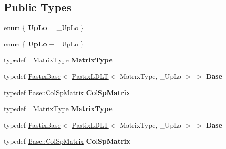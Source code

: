 \subsection*{Public Types}
\begin{DoxyCompactItemize}
\item 
\mbox{\label{class_eigen_1_1_pastix_l_d_l_t_ae905fd8014a25bbb553b24e137499bf1}} 
enum \{ {\bfseries Up\+Lo} = \+\_\+\+Up\+Lo
 \}
\item 
\mbox{\label{class_eigen_1_1_pastix_l_d_l_t_a0846448db6b7a810be7e014578ff71ca}} 
enum \{ {\bfseries Up\+Lo} = \+\_\+\+Up\+Lo
 \}
\item 
\mbox{\label{class_eigen_1_1_pastix_l_d_l_t_ae0a5d38599cff2864016bddbc197b618}} 
typedef \+\_\+\+Matrix\+Type {\bfseries Matrix\+Type}
\item 
\mbox{\label{class_eigen_1_1_pastix_l_d_l_t_a74bfb839262fdaee389e9ef974ab6b64}} 
typedef \hyperlink{class_eigen_1_1_pastix_base}{Pastix\+Base}$<$ \hyperlink{class_eigen_1_1_pastix_l_d_l_t}{Pastix\+L\+D\+LT}$<$ Matrix\+Type, \+\_\+\+Up\+Lo $>$ $>$ {\bfseries Base}
\item 
\mbox{\label{class_eigen_1_1_pastix_l_d_l_t_a259cd5dc41031a40441575cde21e6528}} 
typedef \hyperlink{group___sparse_core___module}{Base\+::\+Col\+Sp\+Matrix} {\bfseries Col\+Sp\+Matrix}
\item 
\mbox{\label{class_eigen_1_1_pastix_l_d_l_t_ae0a5d38599cff2864016bddbc197b618}} 
typedef \+\_\+\+Matrix\+Type {\bfseries Matrix\+Type}
\item 
\mbox{\label{class_eigen_1_1_pastix_l_d_l_t_a74bfb839262fdaee389e9ef974ab6b64}} 
typedef \hyperlink{class_eigen_1_1_pastix_base}{Pastix\+Base}$<$ \hyperlink{class_eigen_1_1_pastix_l_d_l_t}{Pastix\+L\+D\+LT}$<$ Matrix\+Type, \+\_\+\+Up\+Lo $>$ $>$ {\bfseries Base}
\item 
\mbox{\label{class_eigen_1_1_pastix_l_d_l_t_a259cd5dc41031a40441575cde21e6528}} 
typedef \hyperlink{group___sparse_core___module}{Base\+::\+Col\+Sp\+Matrix} {\bfseries Col\+Sp\+Matrix}
\end{DoxyCompactItemize}
